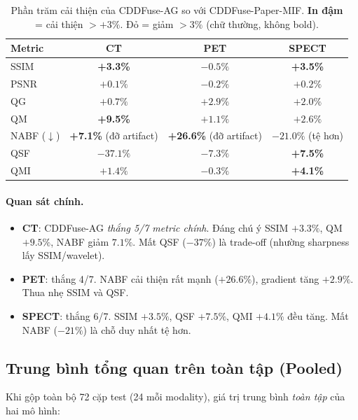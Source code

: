 \begin{table}[h]
\centering
\small
\caption{Phần trăm cải thiện của CDDFuse-AG so với CDDFuse-Paper-MIF. \textbf{In đậm} = cải thiện $> +3\%$. Đỏ = giảm $> 3\%$ (chữ thường, không bold).}
\label{tab:cddfuse-ag-pct}
\begin{tabular}{lccc}
\toprule
\textbf{Metric} & \textbf{CT} & \textbf{PET} & \textbf{SPECT} \\
\midrule
SSIM   & \textbf{+3.3\%} & $-0.5\%$            & \textbf{+3.5\%} \\
PSNR   & $+0.1\%$        & $-0.2\%$            & $+0.2\%$ \\
QG     & $+0.7\%$        & $+2.9\%$            & $+2.0\%$ \\
QM     & \textbf{+9.5\%} & $+1.1\%$            & $+2.6\%$ \\
NABF ($\downarrow$) & \textbf{+7.1\%} (đỡ artifact) & \textbf{+26.6\%} (đỡ artifact) & $-21.0\%$ (tệ hơn) \\
QSF    & $-37.1\%$       & $-7.3\%$            & \textbf{+7.5\%} \\
QMI    & $+1.4\%$        & $-0.3\%$            & \textbf{+4.1\%} \\
\bottomrule
\end{tabular}
\end{table}

\paragraph{Quan sát chính.}
\begin{itemize}\itemsep0pt
    \item \textbf{CT}: CDDFuse-AG \emph{thắng 5/7 metric chính}. Đáng chú ý SSIM $+3.3\%$, QM $+9.5\%$, NABF giảm $7.1\%$. Mất QSF ($-37\%$) là trade-off (nhường sharpness lấy SSIM/wavelet).
    \item \textbf{PET}: thắng 4/7. NABF cải thiện rất mạnh ($+26.6\%$), gradient tăng $+2.9\%$. Thua nhẹ SSIM và QSF.
    \item \textbf{SPECT}: thắng 6/7. SSIM $+3.5\%$, QSF $+7.5\%$, QMI $+4.1\%$ đều tăng. Mất NABF ($-21\%$) là chỗ duy nhất tệ hơn.
\end{itemize}

\subsection{Trung bình tổng quan trên toàn tập (Pooled)}
\label{ssec:pooled-results}

Khi gộp toàn bộ 72 cặp test (24 mỗi modality), giá trị trung bình \emph{toàn tập} của hai mô hình:

